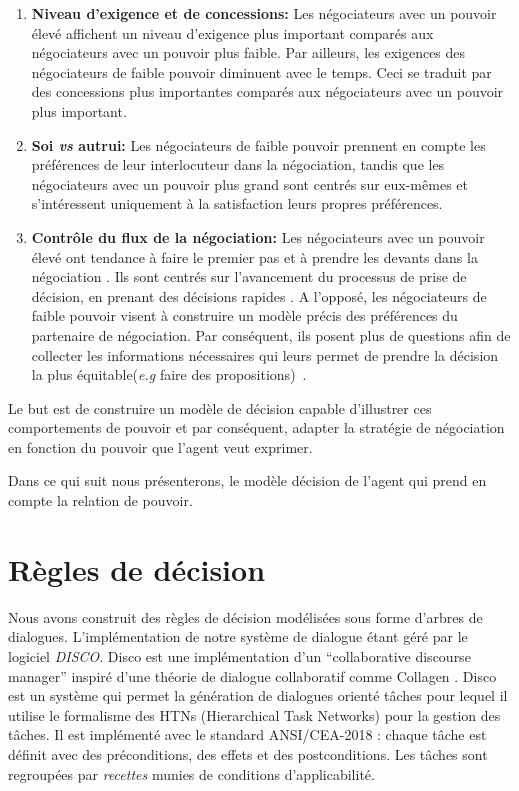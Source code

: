 	\begin{enumerate}
	\item \textbf{Niveau d'exigence et de concessions:} Les négociateurs avec un pouvoir élevé affichent un niveau d'exigence plus important comparés aux négociateurs avec un pouvoir plus faible. Par ailleurs, les exigences des négociateurs de faible pouvoir diminuent avec le temps. Ceci se traduit par des concessions plus importantes comparés aux négociateurs avec un pouvoir plus important. \cite{de1995impact}
	
	\item \textbf{Soi \emph{vs} autrui:} Les négociateurs de faible pouvoir prennent en compte les préférences de leur interlocuteur dans la négociation, tandis que les négociateurs avec un pouvoir plus grand sont  centrés sur eux-mêmes et s'intéressent uniquement à la satisfaction leurs propres préférences. \cite{fiske1993controlling,de1995impact}
	
	\item \textbf{Contrôle du flux de la négociation:}
	Les négociateurs avec un pouvoir élevé ont tendance à faire le premier pas et à prendre les devants dans la négociation \cite {magee2007power}. Ils sont centrés sur l'avancement du processus de prise de décision, en prenant des décisions rapides \cite{zablotskaya2012relating}.
	  A l'opposé, les négociateurs de faible pouvoir visent à construire un modèle précis des préférences du partenaire de négociation. 
	  Par conséquent,  ils posent plus de questions afin de collecter les informations nécessaires qui leurs permet de prendre la décision la plus équitable(\emph{e.g}  faire des propositions)~\cite{de2004influence}. 
	
\end{enumerate}


Le but est de construire un modèle de décision capable d'illustrer ces comportements de pouvoir et par conséquent, adapter la stratégie de négociation en fonction du pouvoir que l'agent veut exprimer.

Dans ce qui suit nous présenterons, le modèle décision de l'agent qui prend en compte la relation de pouvoir.

 
\section{Règles de décision}
	Nous avons construit des règles de décision modélisées sous forme d'arbres de dialogues. L'implémentation de notre système de dialogue étant géré par le logiciel \emph{DISCO}. Disco est une implémentation d'un ``collaborative discourse manager'' inspiré d'une théorie de dialogue collaboratif comme Collagen \cite{rich1997collagen}. Disco est un système qui permet la génération de dialogues orienté tâches pour lequel il utilise le formalisme des HTNs (Hierarchical Task Networks) \cite{erol1994htn} pour la gestion des tâches. Il est implémenté avec le standard ANSI/CEA-2018 : chaque tâche est définit avec des préconditions, des effets et des postconditions. Les tâches sont regroupées par \emph{recettes} munies de conditions d'applicabilité.
	
